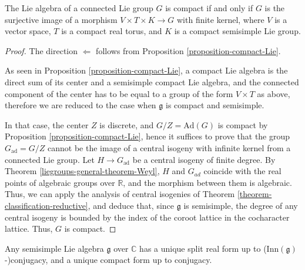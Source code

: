 \begin{theorem}
 \label{theorem-compact-Lie}
The Lie algebra of a connected Lie group $G$ is compact if and only if $G$ is the surjective image of a morphism $V\times T\times K\to G$ with finite kernel, where $V$ is a vector space, $T$ is a compact real torus, and $K$ is a compact semisimple Lie group. 
\end{theorem}

\begin{proof}
 The direction $\Leftarrow$ follows from Proposition \ref{proposition-compact-Lie}.

 As seen in Proposition \ref{proposition-compact-Lie}, a compact Lie algebra is the direct sum of its center and a semisimple compact Lie algebra, and the connected component of the center has to be equal to a group of the form $V\times T$ as above, therefore we are reduced to the case when $\mathfrak g$ is compact and semisimple.
 
 In that case, the center $Z$ is discrete, and $G/Z=\text{Ad}(G)$ is compact by Proposition \ref{proposition-compact-Lie}, hence it suffices to prove that the group $G_{\text{ad}}=G/Z$ cannot be the image of a central isogeny with infinite kernel from a connected Lie group. Let $H\to G_{\text{ad}}$ be a central isogeny of finite degree. By Theorem \ref{liegroups-general-theorem-Weyl}, $H$ and $G_{ad}$ coincide with the real points of algebraic groups over $\mathbb R$, and the morphism between them is algebraic. Thus, we can apply the analysis of central isogenies of Theorem \ref{theorem-classification-reductive}, and deduce that, since $\mathfrak g$ is semisimple, the degree of any central isogeny is bounded by the index of the coroot lattice in the cocharacter lattice. Thus, $G$ is compact.
\end{proof}

\begin{proposition}
 \label{proposition-unique-split-compact-form}
Any semisimple Lie algebra $\mathfrak g$ over $\mathbb C$ has a unique split real form up to ($\text{Inn}(\mathfrak g)$-)conjugacy, and a unique compact form up to conjugacy. 
\end{proposition}

